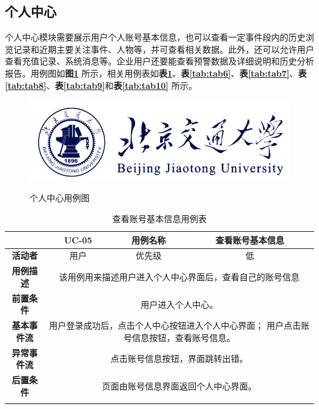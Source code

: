 \subsection{个人中心}

个人中心模块需要展示用户个人账号基本信息，也可以查看一定事件段内的历史浏览记录和近期主要关注事件、人物等，并可查看相关数据。此外，还可以允许用户查看充值记录、系统消息等。企业用户还要能查看预警数据及详细说明和历史分析报告。用例图如\textbf{图\ref{fig:fig2}} 所示，相关用例表如\textbf{表\ref{tab:tab5}}、\textbf{表\ref{tab:tab6}}、\textbf{表\ref{tab:tab7}}、\textbf{表\ref{tab:tab8}}、\textbf{表\ref{tab:tab9}}和\textbf{表\ref{tab:tab10}}  所示。

\begin{figure}[!htb]
	\centering\label{fig:fig2}
	\includegraphics[scale=1]{image/logo1.png}
	\caption{个人中心用例图}
\end{figure}

\begin{longtable}[c]{c|ccc}
	\caption{查看账号基本信息用例表}
	\label{tab:tab5}\\
	\shline
	\multicolumn{1}{c|}{\textbf{用例编号}} & \multicolumn{1}{c|}{UC-05} & \multicolumn{1}{c|}{用例名称} &  查看账号基本信息\\ \hline
	\endhead
	\multicolumn{1}{c|}{\textbf{活动者}} & \multicolumn{1}{c|}{用户} & \multicolumn{1}{c|}{优先级} &低  \\ \hline
	\textbf{用例描述} & \multicolumn{3}{p{12cm}}{该用例用来描述用户进入个人中心界面后，查看自己的账号信息} \\ \hline
	\textbf{前置条件}& \multicolumn{3}{p{12cm}}{用户进入个人中心。} \\ \hline
	\textbf{基本事件流}& \multicolumn{3}{p{12cm}}{用户登录成功后，点击个人中心按钮进入个人中心界面；\newline
	    用户点击账号信息按钮，查看账号信息。
	} \\ \hline
	\textbf{异常事件流}& \multicolumn{3}{p{12cm}}{点击账号信息按钮，界面跳转出错。
	} \\ \hline
	\textbf{后置条件}& \multicolumn{3}{p{12cm}}{页面由账号信息界面返回个人中心界面。} \\ \shline
\end{longtable}


